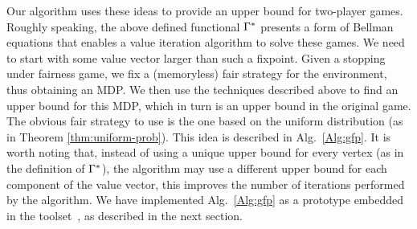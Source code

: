     Our algorithm uses these ideas to provide an upper bound for two-player games.  Roughly speaking,  the above defined functional $\Gamma^*$ presents a form of Bellman equations that enables a value iteration algorithm to solve these games.  We need to start with some value vector larger than such a fixpoint.  Given a stopping under fairness game,  we fix a (memoryless) fair strategy for the environment, thus obtaining an MDP.  We then use the techniques described above  to find an upper bound for this MDP, which in turn is an upper bound in the original game. The obvious fair strategy to use is the one based on the uniform distribution (as in Theorem \ref{thm:uniform-prob}).  This idea is described in Alg.~\ref{Alg:gfp}.  It is worth noting that, instead of using a unique upper bound for every vertex (as in the definition of $\Gamma^*$), the algorithm may use a different upper bound for each component of the value vector, this improves the number of iterations performed by the algorithm. 
We have implemented Alg.~\ref{Alg:gfp} as a prototype embedded in the {\PrismGames} toolset~\cite{DBLP:conf/cav/KwiatkowskaN0S20}, 
as described in the next section. 



%


